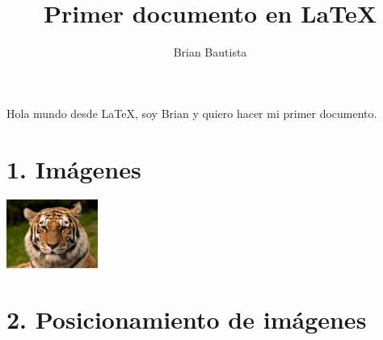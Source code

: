 \documentclass[letterpaper]{article}
\title{Primer documento en \LaTeX}
\author{Brian Bautista}
\begin{document}
    \maketitle
    Hola mundo desde \LaTeX, soy Brian y quiero hacer mi primer documento.

    \section*{1. Im\'agenes}

        \includegraphics[width = 3cm]{tigre.jpg}
    
    \section*{2. Posicionamiento de im\'agenes}

        \begin{figure}[h!]
            \raggedright
        \end{figure}
        
        \begin{figure}[h!]
            \centering
        \end{figure}

        \begin{figure}[h!]
            \raggedleft
        \end{figure}
\end{document}

